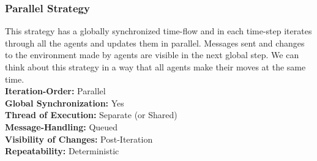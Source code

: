 \subsubsection{Parallel Strategy}
This strategy has a globally synchronized time-flow and in each time-step iterates through all the agents and updates them in parallel. Messages sent and changes to the environment made by agents are visible in the next global step. We can think about this strategy in a way that all agents make their moves at the same time. \\

\textbf{Iteration-Order:} Parallel \\
\textbf{Global Synchronization:} Yes \\
\textbf{Thread of Execution:} Separate (or Shared) \\
\textbf{Message-Handling:} Queued \\
\textbf{Visibility of Changes:}	Post-Iteration \\
\textbf{Repeatability:}	Deterministic

